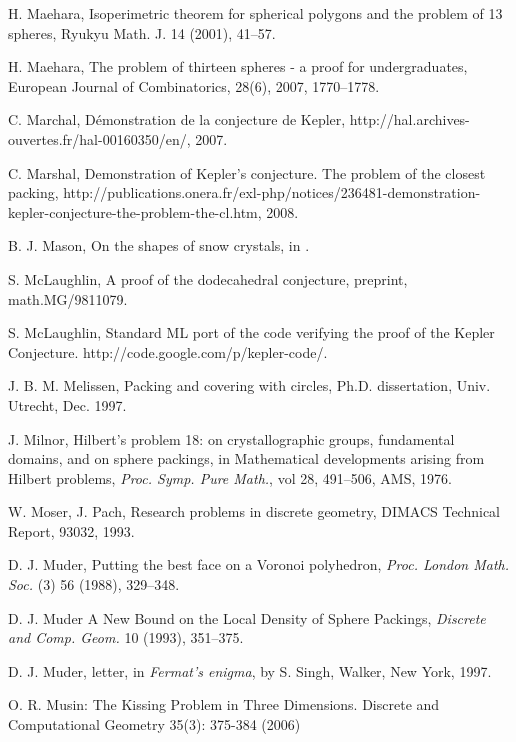 \begin{thebibliography}{CHMS94}
 H. Maehara, Isoperimetric theorem for spherical
polygons and the problem of 13 spheres, Ryukyu Math. J. 14 (2001), 41--57.

 H. Maehara, The problem of thirteen spheres - a proof for undergraduates, European Journal of Combinatorics, 28(6), 2007,
1770--1778.

 C. Marchal, D\'emonstration de la conjecture de Kepler,
http://hal.archives-ouvertes.fr/hal-00160350/en/, 2007.

 C. Marshal, Demonstration of Kepler's conjecture. The problem of the closest packing, http://publications.onera.fr/exl-php/notices/236481-demonstration-kepler-conjecture-the-problem-the-cl.htm, 2008.

 B. J. Mason, On the shapes of snow crystals, in \cite{Kep66}.

 S. McLaughlin, A proof of the dodecahedral conjecture,
    preprint, math.MG/9811079.

 S. McLaughlin, Standard ML port of the code
verifying the proof of the Kepler Conjecture.
http://code.google.com/p/kepler-code/.

 J. B. M. Melissen, Packing and covering with circles,
    Ph.D. dissertation, Univ. Utrecht, Dec. 1997.

 J. Milnor, Hilbert's problem 18: on crystallographic groups,
    fundamental domains, and on sphere packings, in
    Mathematical developments arising from Hilbert problems,
    {\it Proc. Symp. Pure Math.}, vol 28, 491--506, AMS, 1976.

 W. Moser, J. Pach, Research problems in discrete geometry,
    DIMACS Technical Report, 93032, 1993.

 D. J. Muder, Putting the best face on a Voronoi polyhedron,
    {\it Proc. London Math. Soc.} (3) 56 (1988), 329--348.


  D. J. Muder A New Bound on the Local Density
of Sphere Packings, {\it Discrete and Comp. Geom.} 10 (1993),
351--375.

  D. J. Muder, letter, in {\it Fermat's enigma}, by S. Singh,
        Walker, New York, 1997.

  O. R. Musin: The Kissing Problem in Three Dimensions. Discrete and Computational Geometry 35(3): 375-384 (2006)


\end{thebibliography}
